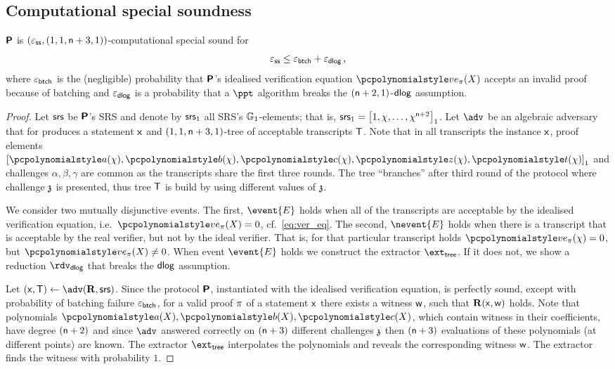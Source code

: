 \documentclass[runningheads,11pt]{llncs}
\begin{document}
\subsection{Computational special soundness}
\begin{lemma}
\label{lem:plonkprot_ss}
$\bm{\mathsf{P}}$ is $(\varepsilon_{\mathsf{ss}}, (1, 1, \mathsf{n} + 3, 1))$-computational special sound
for 
 \[
	\varepsilon_{\mathsf{ss}} \leq \varepsilon_{\mathsf{btch}} + \varepsilon_{\mathsf{dlog}}\,,
 \] 
 where $\varepsilon_{\mathsf{btch}}$ is the (negligible) probability that $\bm{\mathsf{P}}$'s idealised
 verification equation $\vereq_\zkproof(X)$ accepts an invalid proof because of batching
 and $\varepsilon_{\mathsf{dlog}}$ is a probability that a $\ppt$ algorithm breaks the
 $(\mathsf{n} + 2, 1)$-$\mathsf{dlog}$ assumption.
\end{lemma}
\begin{proof}
  Let $\mathsf{srs}$ be $\bm{\mathsf{P}}$'s SRS and denote by $\mathsf{srs}_1$ all SRS's
  $\mathbb{G}_1$-elements; that is,
  $\mathsf{srs}_1 = \left[1, \chi, \ldots, \chi^{\mathsf{n} + 2}\right]_{1}$. Let $\adv$ be an
  algebraic adversary that for produces a statement $\mathsf{x}$ and
  $(1, 1, \mathsf{n} + 3, 1)$-tree of acceptable transcripts $\mathsf{T}$.  Note that in
  all transcripts the instance $\mathsf{x}$, proof elements
  $\gone{\p{a}(\chi), \p{b}(\chi), \p{c}(\chi), \p{z}(\chi), \p{t}(\chi)}$ and
  challenges $\alpha, \beta, \gamma$ are common as the transcripts share the
  first three rounds. The tree ``branches'' after third round of the protocol
  where challenge $\mathfrak{z}$ is presented, thus tree $\mathsf{T}$ is build by using different
  values of $\mathfrak{z}$. 

  We consider two mutually disjunctive events. The first, $\event{E}$ holds when
  all of the transcripts are acceptable by the idealised verification equation,
  i.e.~$\vereq_\zkproof(X) = 0$, cf.~\cref{eq:ver_eq}. The second, $\nevent{E}$ holds
  when there is a transcript that is acceptable by the real verifier, but not by
  the ideal verifier. That is, for that particular transcript holds
  $\vereq_\zkproof(\chi) = 0$, but $\vereq_\zkproof(X) \neq 0$.  When event $\event{E}$ holds we
  construct the extractor $\extt$. If it does not, we show a reduction
  $\rdvdlog$ that breaks the $\mathsf{dlog}$ assumption.

   Let $(\inp, \tree) \gets \adv(\REL,
  \srs)$. Since the protocol $\bm{\mathsf{P}}$, instantiated with the idealised
  verification equation, is perfectly sound, except with probability of batching
  failure $\varepsilon_{\mathsf{btch}}$, for a valid proof $\pi$ of a statement $\mathsf{x}$ there
  exists a witness $\mathsf{w}$, such that $\mathbf{R}(\mathsf{x}, \mathsf{w})$ holds. Note that 
  polynomials $\p{a}(X), \p{b}(X), \p{c}(X)$, which contain witness in their
  coefficients, have degree $(\mathsf{n} + 2)$ and since $\adv$ answered correctly
  on $(\mathsf{n} + 3)$ different challenges $\mathfrak{z}$ then $(\mathsf{n} + 3)$ evaluations
  of these polynomials (at different points) are known. The extractor $\extt$
  interpolates the polynomials and reveals the corresponding witness
  $\mathsf{w}$. The extractor finds the witness with probability $1$.


\end{proof}
\end{document}
